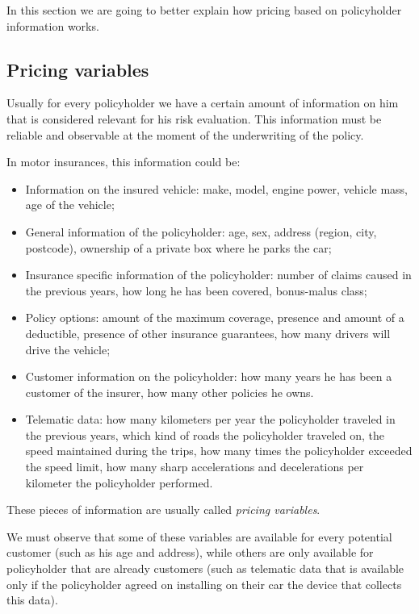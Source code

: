\documentclass[a4paper, twoside, openright, 12pt]{report}
\providecommand{\tightlist}{%
  \setlength{\itemsep}{0pt}\setlength{\parskip}{0pt}}
\theoremstyle{definition}
\theoremstyle{definition}
\theoremstyle{definition}
\theoremstyle{remark}
\begin{document}
In this section we are going to better explain how pricing based on policyholder information works.

\hypertarget{chap:pricing-variables}{%
\subsection{Pricing variables}\label{chap:pricing-variables}}

Usually for every policyholder we have a certain amount of information on him that is considered relevant for his risk evaluation. This information must be reliable and observable at the moment of the underwriting of the policy.

In motor insurances, this information could be:

\begin{itemize}
\tightlist
\item
  Information on the insured vehicle: make, model, engine power, vehicle mass, age of the vehicle;
\item
  General information of the policyholder: age, sex, address (region, city, postcode), ownership of a private box where he parks the car;
\item
  Insurance specific information of the policyholder: number of claims caused in the previous years, how long he has been covered, bonus-malus class;
\item
  Policy options: amount of the maximum coverage, presence and amount of a deductible, presence of other insurance guarantees, how many drivers will drive the vehicle;
\item
  Customer information on the policyholder: how many years he has been a customer of the insurer, how many other policies he owns.
\item
  Telematic data: how many kilometers per year the policyholder traveled in the previous years, which kind of roads the policyholder traveled on, the speed maintained during the trips, how many times the policyholder exceeded the speed limit, how many sharp accelerations and decelerations per kilometer the policyholder performed.
\end{itemize}

These pieces of information are usually called \emph{pricing variables}.

We must observe that some of these variables are available for every potential customer (such as his age and address), while others are only available for policyholder that are already customers (such as telematic data that is available only if the policyholder agreed on installing on their car the device that collects this data).
\end{document}
